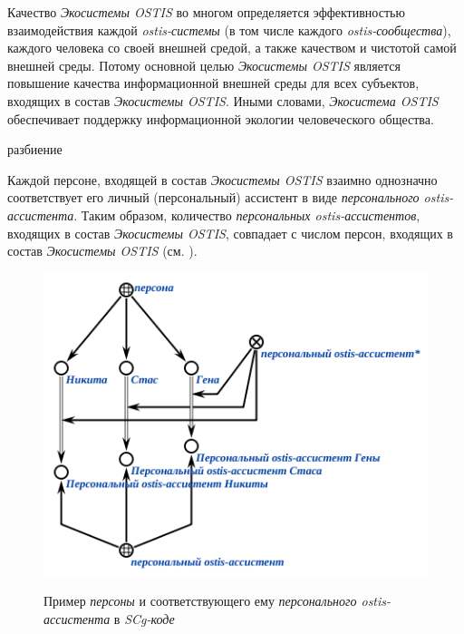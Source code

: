Качество \textit{Экосистемы OSTIS} во многом определяется эффективностью взаимодействия каждой \textit{ostis-системы} (в том числе каждого \textit{ostis-сообщества}), каждого человека со своей внешней средой, а также качеством и чистотой самой внешней среды. 
Потому основной целью \textit{Экосистемы OSTIS} является повышение качества информационной внешней среды для всех субъектов, входящих в состав \textit{Экосистемы OSTIS}.
Иными словами, \textit{Экосистема OSTIS} обеспечивает поддержку информационной экологии человеческого общества.

\begin{SCn}
\begin{scnrelfromset}{разбиение}
\end{scnrelfromset}
\end{SCn}

Каждой персоне, входящей в состав \textit{Экосистемы OSTIS} взаимно однозначно соответствует его личный (персональный) ассистент в виде \textit{персонального ostis-ассистента}.
Таким образом, количество \textit{персональных ostis-ассистентов}, входящих в состав \textit{Экосистемы OSTIS}, совпадает с числом персон, входящих в состав \textit{Экосистемы OSTIS} (см. ).

\begin{figure}[H]
    \caption{Пример \textit{персоны} и соответствующего ему \textit{персонального ostis-ассистента} в \textit{SCg-коде}}
    \includegraphics[scale=0.8]{author/part7/chapter_ecosystem/figures/personal_ostis_assistant_example_ru.png}
    \label{fig:ostis_assistant}
\end{figure}

